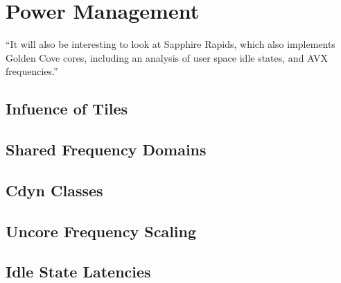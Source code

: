 \chapter{Power Management}
``It will also be interesting to look at Sapphire Rapids, which also implements Golden Cove cores, including an analysis of user space idle states, and AVX frequencies.''

\section{Infuence of Tiles}

\section{Shared Frequency Domains}

\section{Cdyn Classes}

\section{Uncore Frequency Scaling}

\section{Idle State Latencies}

